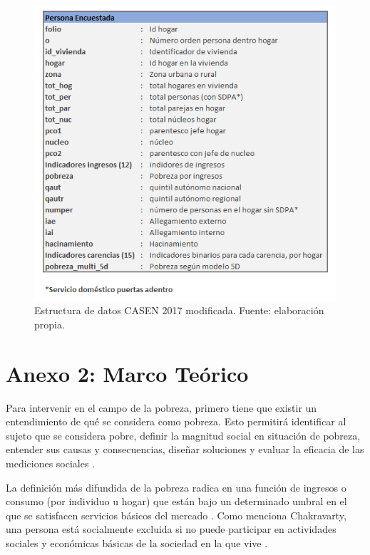 \documentclass[12pt,letterpaper,spanish]{article}
\begin{document}
\begin{figure} [H]
        \centering
        \includegraphics{estructura.png}
        \caption{Estructura de datos CASEN 2017 modificada. Fuente: elaboración propia.}
        \label{estructura}
    \end{figure}

\newpage

\section*{\centering Anexo 2: Marco Teórico}\label{descripcion_base_datos}

Para intervenir en el campo de la pobreza, primero tiene que existir un entendimiento de qué se considera como pobreza. Esto permitirá identificar al sujeto que se considera pobre, definir la magnitud social en situación de pobreza, entender sus causas y consecuencias, diseñar soluciones y evaluar la eficacia de las mediciones sociales \cite{Beytia2016LaMultidimensional}. 

La definición más difundida de la pobreza radica en una función de ingresos o consumo (por individuo u hogar) que están bajo un determinado umbral en el que se satisfacen servicios básicos del mercado \cite{Ravallion2011OnPoverty}. Como menciona Chakravarty, una persona está socialmente excluida si no puede participar en actividades sociales y económicas básicas de la sociedad en la que vive \cite{Chakravarty2003TheExclusion}.
\end{document}

